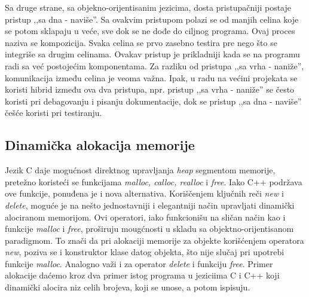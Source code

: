 \documentclass[a4paper]{article}
\begin{document}
Sa druge strane, sa objekno-orijentisanim jezicima, dosta pristupačniji postaje pristup ,,sa dna - naviše''. Sa ovakvim pristupom polazi se od manjih celina koje se potom sklapaju u veće, sve dok se ne dođe do ciljnog programa. Ovaj proces naziva se kompozicija. Svaka celina se prvo zasebno testira pre nego što se integriše sa drugim celinama. Ovakav pristup je prikladniji kada se na programu radi sa već postojećim komponentama. Za razliku od pristupa ,,sa vrha - naniže'', komunikacija između celina je veoma važna. Ipak, u radu na većini projekata se koristi hibrid između ova dva pristupa, npr. pristup ,,sa vrha - naniže'' se često koristi pri debagovanju i pisanju dokumentacije, dok se pristup ,,sa dna - naviše'' češće koristi pri testiranju.

\subsection{Dinamička alokacija memorije}

Jezik C daje mogućnost direktnog upravljanja \emph{heap} segmentom memorije, pretežno koristeći se funkcijama \emph{malloc, calloc, realloc} i \emph{free}. Iako C++ podržava ove funkcije, ponuđena je i nova alternativa. Koriščenjem ključnih reči \emph{new} i \emph{delete}, moguće je na nešto jednostavniji i elegantniji način upravljati dinamički alociranom memorijom. Ovi operatori, iako funkcionišu na sličan način kao i funkcije \emph{malloc} i \emph{free}, proširuju mougćnosti u skladu sa objektno-orijentisanom paradigmom. To znači da pri alokaciji memorije za objekte korišćenjem operatora \emph{new}, poziva se i konstruktor klase datog objekta, što nije slučaj pri upotrebi funkcije \emph{malloc}. Analogno važi i za operator \emph{delete} i funkciju \emph{free}. Primer alokacije daćemo kroz dva primer istog programa u jeziciima C i C++ koji dinamički alocira niz celih brojeva, koji se unose, a potom ispisuju.
\end{document}

